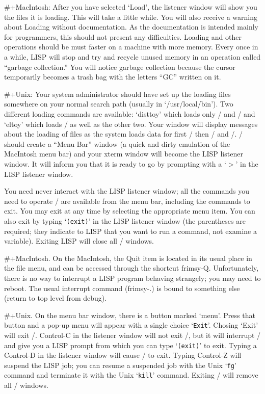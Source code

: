\#+MacIntosh:  After you have selected `Load', the listener window will
show you the files it is loading.  This will take a little while.  You
will also receive a warning about Loading without documentation.  As
the documentation is intended mainly for programmers, this should not
present any difficulties.  Loading and other operations should be must
faster on a machine with more memory.  Every once in a while, LISP
will stop and try and recycle unused memory in an operation called
``garbage collection.''  You will notice garbage collection because
the cursor temporarily becomes a trash bag with the letters ``GC''
written on it.

\#+Unix:  Your system administrator should have set up the loading
files somewhere on your normal search path (usually in
`/usr/local/bin'). 
Two different loading commands are available:  `disttoy' which loads
only \disttoy/ and \clttoy/ and `eltoy' which loads \eltoy/ as well as
the other two.  Your window will display messages about the loading of
files as the system loads data for first \xlispstat/ then \disttoy/
and \eltoy/.  \eltoy/ should create a ``Menu Bar'' window
(a quick and dirty emulation of the MacIntosh menu bar) and your
xterm window will become the LISP listener window.  It will inform you
that it is ready to go by prompting with a `$>$' in the LISP listener
window.

You need never interact with the LISP listener window; all the commands
you need to operate \eltoy/ are available from the menu bar, including
the commands to exit.  You may exit at any time by selecting the
appropriate menu item.  You can also exit by typing 
`{\tt (exit)}'
in the LISP listener window
(the parentheses are required; they indicate to LISP that you want to
run a command, not examine a variable).
Exiting LISP will close all \eltoy/ windows.

\#+MacIntosh.  On the MacIntosh, the Quit item is located in its usual
place in the file menu, and can be accessed through the shortcut
frimsy-Q.  Unfortunately, there is no way to interrupt a LISP program
behaving strangely; you may need to reboot.  The usual interrupt
command (frimsy-{.}) is bound to something else
(return to top level from debug).

\#+Unix.  On the menu bar window, there is a button marked `menu'.
Press that button and a pop-up menu will appear with a single choice 
`{\tt Exit}'.  Chosing 
`Exit' will exit \xlispstat/.  Control-C in the listener window will
not exit \xlispstat/, but it will interrupt \xlispstat/ and give you a
LISP prompt from which you can type 
`{\tt (exit)}' to exit.  Typing a Control-D in the listener window will
cause \xlispstat/ to exit.  Typing Control-Z will suspend the LISP
job; you can resume a suspended job with the Unix 
`{\tt fg}' command
and terminate it with the Unix 
`{\tt kill}' command.  Exiting \xlispstat/ will remove all \eltoy/
windows.

